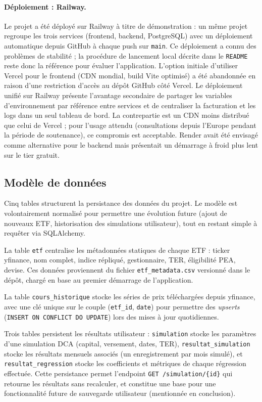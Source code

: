 \documentclass[11pt,a4paper]{article}
\begin{document}
\paragraph{Déploiement : Railway.}
Le projet a été déployé sur Railway à titre de démonstration : un même
projet regroupe les trois services (frontend, backend, PostgreSQL) avec
un déploiement automatique depuis GitHub à chaque push sur
\texttt{main}. Ce déploiement a connu des problèmes de stabilité ; la
procédure de lancement local décrite dans le \texttt{README} reste donc
la référence pour évaluer l'application.
L'option initiale d'utiliser Vercel pour le frontend (CDN mondial,
build Vite optimisé) a été abandonnée en raison d'une restriction
d'accès au dépôt GitHub côté Vercel. Le déploiement unifié sur Railway
présente l'avantage secondaire de partager les variables d'environnement
par référence entre services et de centraliser la facturation et les
logs dans un seul tableau de bord. La contrepartie est un CDN moins
distribué que celui de Vercel ; pour l'usage attendu (consultations
depuis l'Europe pendant la période de soutenance), ce compromis est
acceptable. Render avait été envisagé comme alternative pour le backend
mais présentait un démarrage à froid plus lent sur le tier gratuit.

\subsection{Modèle de données}

Cinq tables structurent la persistance des données du projet. Le
modèle est volontairement normalisé pour permettre une évolution
future (ajout de nouveaux ETF, historisation des simulations
utilisateur), tout en restant simple à requêter via SQLAlchemy.

La table \texttt{etf} centralise les métadonnées statiques de chaque
ETF : ticker yfinance, nom complet, indice répliqué, gestionnaire,
TER, éligibilité PEA, devise. Ces données proviennent du fichier
\texttt{etf\_metadata.csv} versionné dans le dépôt, chargé en base
au premier démarrage de l'application.

La table \texttt{cours\_historique} stocke les séries de prix
téléchargées depuis yfinance, avec une clé unique sur le couple
(\texttt{etf\_id}, \texttt{date}) pour permettre des
\textit{upserts} (\texttt{INSERT ON CONFLICT DO UPDATE}) lors des
mises à jour quotidiennes.

Trois tables persistent les résultats utilisateur :
\texttt{simulation} stocke les paramètres d'une simulation DCA
(capital, versement, dates, TER), \texttt{resultat\_simulation}
stocke les résultats mensuels associés (un enregistrement par mois
simulé), et \texttt{resultat\_regression} stocke les coefficients et
métriques de chaque régression effectuée. Cette persistance permet
l'endpoint \texttt{GET /simulation/\{id\}} qui retourne les
résultats sans recalculer, et constitue une base pour une
fonctionnalité future de sauvegarde utilisateur (mentionnée en
conclusion).
\end{document}
